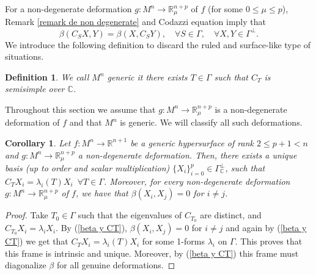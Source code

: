 \documentclass{article}
\newtheorem{cor}[thm]{Corollary}
\newtheorem{defn}[thm]{Definition}
\theoremstyle{remark}
\begin{document}
For a non-degenerate deformation $g:M^n\rightarrow\mathbb{R}^{n+p}_{\mu}$ of $f$ (for some $0\leq \mu\leq p$), Remark \ref{remark de non degenerate} and Codazzi equation imply that 
\begin{equation}\label{beta y CT}
    \beta(C_SX,Y)=\beta(X,C_S Y),\quad\forall S\in\Gamma,\quad\forall X,Y\in\Gamma^\perp.
\end{equation}
We introduce the following definition to discard the ruled and surface-like type of situations.

\begin{defn}\label{f generica}
    \normalfont We call $M^n$ {\it generic} it there exists $T\in\Gamma$ such that $C_T$ is semisimple over $\mathbb{C}$. 
\end{defn}

Throughout this section we assume that $g:M^n\rightarrow\mathbb{R}^{n+p}_{\mu}$ is a non-degenerate deformation of $f$ and that $M^n$ is generic. We will classify all such deformations.

\begin{cor}\label{corolario generica implica S(beta)=todo y nulidad}
    Let $f:M^n\rightarrow\mathbb{R}^{n+1}$ be a generic hypersurface of rank $2\leq p+1< n$ and $g:M^n\rightarrow\mathbb{R}^{n+p}_{\mu}$ a non-degenerate deformation. Then, there exists a unique basis (up to order and scalar multiplication) $\{X_i\}_{i=0}^p\in\Gamma^\perp _{\mathbb{C}}$, such that $C_TX_i=\lambda_i(T)X_i\,\,\,\forall T\in\Gamma$. Moreover, for every non-degenerate deformation $g:M^n\rightarrow\mathbb{R}^{n+p}_{\mu}$ of $f$, we have that $\beta(X_i,X_j)=0$ for $i\neq j$.
\end{cor}

\begin{proof}
    Take $T_0\in\Gamma$ such that the eigenvalues of $C_{T_0}$ are distinct, and $C_{T_0}X_i=\lambda_iX_i$. By (\ref{beta y CT}), $\beta(X_i,X_j)=0$ for $i\neq j$ and again by (\ref{beta y CT}) we get that $C_TX_i=\lambda_i(T)X_i$ for some 1-forms $\lambda_i$ on $\Gamma$. This proves that this frame is intrinsic and unique. Moreover, by (\ref{beta y CT}) this frame must diagonalize $\beta$ for all genuine deformations. 
\end{proof}
\end{document}
